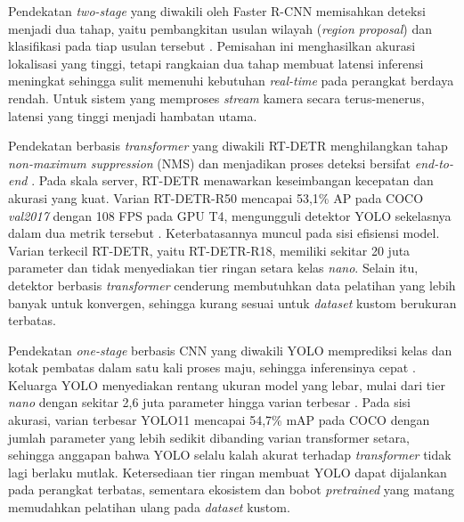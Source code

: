 Pendekatan \textit{two-stage} yang diwakili oleh Faster R-CNN memisahkan deteksi menjadi 
dua tahap, yaitu pembangkitan usulan wilayah (\textit{region proposal}) dan klasifikasi 
pada tiap usulan tersebut \cite{ren2015faster}. Pemisahan ini menghasilkan akurasi 
lokalisasi yang tinggi, tetapi rangkaian dua tahap membuat latensi inferensi meningkat 
sehingga sulit memenuhi kebutuhan \textit{real-time} pada perangkat berdaya rendah. Untuk 
sistem yang memproses \textit{stream} kamera secara terus-menerus, latensi yang tinggi menjadi 
hambatan utama.

Pendekatan berbasis \textit{transformer} yang diwakili RT-DETR menghilangkan tahap 
\textit{non-maximum suppression} (NMS) dan menjadikan proses deteksi bersifat 
\textit{end-to-end} \cite{zhao2024rtdetr}. Pada skala server, RT-DETR menawarkan 
keseimbangan kecepatan dan akurasi yang kuat. Varian RT-DETR-R50 mencapai 53,1\% AP pada 
COCO \textit{val2017} dengan 108 FPS pada GPU T4, mengungguli detektor YOLO sekelasnya 
dalam dua metrik tersebut \cite{zhao2024rtdetr}. Keterbatasannya muncul pada sisi 
efisiensi model. Varian terkecil RT-DETR, yaitu RT-DETR-R18, memiliki sekitar 20 juta 
parameter dan tidak menyediakan tier ringan setara kelas \textit{nano}. Selain itu, 
detektor berbasis \textit{transformer} cenderung membutuhkan data pelatihan yang lebih 
banyak untuk konvergen, sehingga kurang sesuai untuk \textit{dataset} kustom berukuran 
terbatas.

Pendekatan \textit{one-stage} berbasis CNN yang diwakili YOLO memprediksi kelas dan kotak 
pembatas dalam satu kali proses maju, sehingga inferensinya cepat \cite{redmon2016yolo}. 
Keluarga YOLO menyediakan rentang ukuran model yang lebar, mulai dari tier \textit{nano} 
dengan sekitar 2,6 juta parameter hingga varian terbesar 
\cite{terven2023comprehensive, khanam2024yolov11}. Pada sisi akurasi, varian terbesar 
YOLO11 mencapai 54,7\% mAP pada COCO dengan jumlah parameter yang lebih sedikit dibanding 
varian transformer setara, sehingga anggapan bahwa YOLO selalu kalah akurat terhadap 
\textit{transformer} tidak lagi berlaku mutlak. Ketersediaan tier ringan membuat YOLO 
dapat dijalankan pada perangkat terbatas, sementara ekosistem dan bobot 
\textit{pretrained} yang matang memudahkan pelatihan ulang pada \textit{dataset} kustom.

